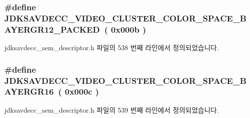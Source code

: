 \subsubsection[{\texorpdfstring{J\+D\+K\+S\+A\+V\+D\+E\+C\+C\+\_\+\+V\+I\+D\+E\+O\+\_\+\+C\+L\+U\+S\+T\+E\+R\+\_\+\+C\+O\+L\+O\+R\+\_\+\+S\+P\+A\+C\+E\+\_\+\+B\+A\+Y\+E\+R\+G\+R12\+\_\+\+P\+A\+C\+K\+ED}{JDKSAVDECC_VIDEO_CLUSTER_COLOR_SPACE_BAYERGR12_PACKED}}]{\setlength{\rightskip}{0pt plus 5cm}\#define J\+D\+K\+S\+A\+V\+D\+E\+C\+C\+\_\+\+V\+I\+D\+E\+O\+\_\+\+C\+L\+U\+S\+T\+E\+R\+\_\+\+C\+O\+L\+O\+R\+\_\+\+S\+P\+A\+C\+E\+\_\+\+B\+A\+Y\+E\+R\+G\+R12\+\_\+\+P\+A\+C\+K\+ED~( 0x000b )}\hypertarget{group__video__cluster__color__space_ga7cf0989191db299ea9332edcbcc49da6}{}\label{group__video__cluster__color__space_ga7cf0989191db299ea9332edcbcc49da6}


jdksavdecc\+\_\+aem\+\_\+descriptor.\+h 파일의 538 번째 라인에서 정의되었습니다.

\subsubsection[{\texorpdfstring{J\+D\+K\+S\+A\+V\+D\+E\+C\+C\+\_\+\+V\+I\+D\+E\+O\+\_\+\+C\+L\+U\+S\+T\+E\+R\+\_\+\+C\+O\+L\+O\+R\+\_\+\+S\+P\+A\+C\+E\+\_\+\+B\+A\+Y\+E\+R\+G\+R16}{JDKSAVDECC_VIDEO_CLUSTER_COLOR_SPACE_BAYERGR16}}]{\setlength{\rightskip}{0pt plus 5cm}\#define J\+D\+K\+S\+A\+V\+D\+E\+C\+C\+\_\+\+V\+I\+D\+E\+O\+\_\+\+C\+L\+U\+S\+T\+E\+R\+\_\+\+C\+O\+L\+O\+R\+\_\+\+S\+P\+A\+C\+E\+\_\+\+B\+A\+Y\+E\+R\+G\+R16~( 0x000c )}\hypertarget{group__video__cluster__color__space_gac8aa87242f4a3a0b1495931183d17586}{}\label{group__video__cluster__color__space_gac8aa87242f4a3a0b1495931183d17586}


jdksavdecc\+\_\+aem\+\_\+descriptor.\+h 파일의 539 번째 라인에서 정의되었습니다.

